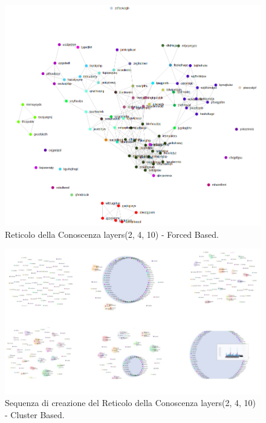 \begin{figure}[H]
\centering
	\includegraphics[width=0.70\linewidth]{./image/logica(2,4,10)_forced.png}
	\caption{Reticolo della Conoscenza layers(2, 4, 10) - Forced Based.}
	\label{Reticolo della Conoscenza layers(2, 4, 10)) - Forced Based.}
\end{figure}
\noindent

\begin{figure}[H]
\centering
	\includegraphics[width=0.80\linewidth]{./image/collage_reticolo-logica(2,4,10).png}
	\caption{Sequenza di creazione del Reticolo della Conoscenza layers(2, 4, 10) - Cluster Based.}
	\label{Sequenza di creazione del Reticolo della Conoscenza layers(2, 4, 10) - Cluster Based.}
\end{figure}
\noindent
